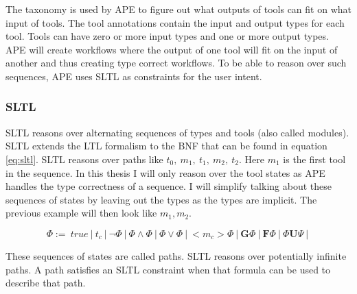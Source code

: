 \documentclass{article}
\begin{document}
The taxonomy is used by APE to figure out what outputs of tools can fit on what input of tools. The tool annotations contain the input and output types for each tool. Tools can have zero or more input types and one or more output types. APE will create workflows where the output of one tool will fit on the input of another and thus creating type correct workflows. To be able to reason over such sequences, APE uses SLTL as constraints for the user intent. 




\subsubsection{SLTL}

SLTL reasons over alternating sequences of types and tools (also called modules). SLTL extends the LTL formalism to the BNF that can be found in equation \ref{eq:sltl}. SLTL reasons over paths like $t_0,\ m_1,\ t_1,\ m_2,\ t_2$. Here $m_1$ is the first tool in the sequence. In this thesis I will only reason over the tool states as APE handles the type correctness of a sequence. I will simplify talking about these sequences of states by leaving out the types as the types are implicit. The previous example will then look like $m_1, m_2$.



\begin{equation}
    \Phi :=\ true\ |\ t_c\ |\ \neg \Phi\ |\ \Phi \wedge \Phi\ |\ \Phi \vee \Phi\ |\ <m_c> \Phi\ |\  \textbf{G} \Phi\ |\ \textbf{F} \Phi\ |\  \Phi \textbf{U} \Psi\ |\  \label{eq:sltl}
\end{equation} 

These sequences of states are called paths. SLTL reasons over potentially infinite paths. A path satisfies an SLTL constraint when that formula can be used to describe that path. 
\end{document}
